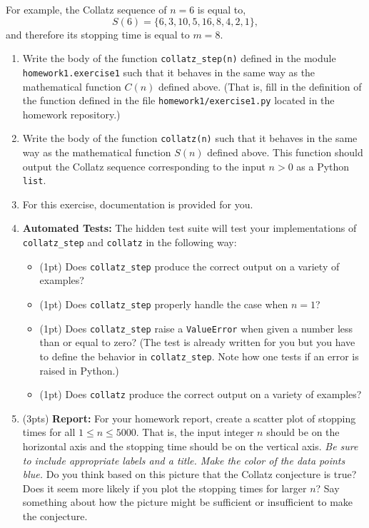 \documentclass[12pt]{article}
\begin{document}
For example, the Collatz sequence of $n=6$ is equal to,
\[
  S(6) = \{6, 3, 10, 5, 16, 8, 4, 2, 1\},
\]
and therefore its stopping time is equal to $m=8$.
\begin{enumerate}
\item Write the body of the function {\tt collatz\_step(n)} defined in the
  module {\tt homework1.exercise1} such that it behaves in the same way as the
  mathematical function $C(n)$ defined above. (That is, fill in the definition
  of the function defined in the file {\tt homework1/exercise1.py} located in
  the homework repository.)
\item Write the body of the function {\tt collatz(n)} such that it behaves in
  the same way as the mathematical function $S(n)$ defined above. This function
  should output the Collatz sequence corresponding to the input $n > 0$ as a
  Python {\tt list}.
\item For this exercise, documentation is provided for you.
\item {\bf Automated Tests:} The hidden test suite will test your
  implementations of {\tt collatz\_step} and {\tt collatz} in the following way:
  \begin{itemize}
  \item (1pt) Does {\tt collatz\_step} produce the correct output on a variety
    of examples?
  \item (1pt) Does {\tt collatz\_step} properly handle the case when $n = 1$?
  \item (1pt) Does {\tt collatz\_step} raise a {\tt ValueError} when given a
    number less than or equal to zero? (The test is already written for you but
    you have to define the behavior in {\tt collatz\_step}. Note how one tests
    if an error is raised in Python.)
  \item (1pt) Does {\tt collatz} produce the correct output on a variety of
    examples?
  \end{itemize}
\item (3pts) {\bf Report:} For your homework report, create a scatter plot of
  stopping times for all $1 \leq n \leq 5000$. That is, the input integer $n$
  should be on the horizontal axis and the stopping time should be on the
  vertical axis. {\it Be sure to include appropriate labels and a title. Make
    the color of the data points blue.} Do you think based on this picture that
  the Collatz conjecture is true? Does it seem more likely if you plot the
  stopping times for larger $n$? Say something about how the picture might be
  sufficient or insufficient to make the conjecture.
\end{enumerate}
\end{document}
